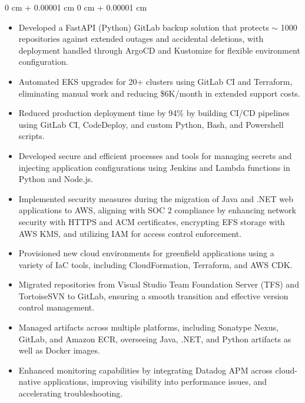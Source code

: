 \documentclass[11pt, letterpaper]{article}
\newenvironment{highlights}{
\begin{itemize}[
topsep=0.10 cm,
parsep=0.10 cm,
partopsep=0pt,
itemsep=0pt,
leftmargin=0 cm + 10pt
]
}{
\end{itemize}
} %
\newenvironment{onecolentry}{
\begin{adjustwidth}{
0 cm + 0.00001 cm
}{
0 cm + 0.00001 cm
}
}{
\end{adjustwidth}
} %
\begin{document}
\vspace{0.10 cm}
\begin{onecolentry}
\begin{highlights}
\item Developed a FastAPI (Python) GitLab backup solution that protects $\sim$ 1000 repositories against extended outages and accidental deletions, with deployment handled through ArgoCD and Kustomize for flexible environment configuration.
\item Automated EKS upgrades for 20+ clusters using GitLab CI and Terraform, eliminating manual work and reducing \$6K/month in extended support costs.
\item Reduced production deployment time by 94\% by building CI/CD pipelines using GitLab CI, CodeDeploy, and custom Python, Bash, and Powershell scripts.
\item Developed secure and efficient processes and tools for managing secrets and injecting application configurations using Jenkins and Lambda functions in Python and Node.js.
\item Implemented security measures during the migration of Java and .NET web applications to AWS, aligning with SOC 2 compliance by enhancing network security with HTTPS and ACM certificates, encrypting EFS storage with AWS KMS, and utilizing IAM for access control enforcement.
\item Provisioned new cloud environments for greenfield applications using a variety of IaC tools, including CloudFormation, Terraform, and AWS CDK.
\item  Migrated repositories from Visual Studio Team Foundation Server (TFS) and TortoiseSVN to GitLab, ensuring a smooth transition and effective version control management.
\item  Managed artifacts across multiple platforms, including Sonatype Nexus, GitLab, and Amazon ECR, overseeing Java, .NET, and Python artifacts as well as Docker images.
\item Enhanced monitoring capabilities by integrating Datadog APM across cloud-native applications, improving visibility into performance issues, and accelerating troubleshooting.
\end{highlights}
\end{onecolentry}
\end{document}
